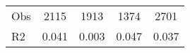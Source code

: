 \begin{tabular}{l*{4}{c}}
\hline                                                                                                                                                                                                                                            
 Obs                   &               2115               &       1913                       &       1374                &              2701                                               \\ 
 R2                    &                      0.041              &              0.003                      &              0.047               &                     0.037                                              \\ 
\hline \end{tabular}                                                                                                                                                                                                              